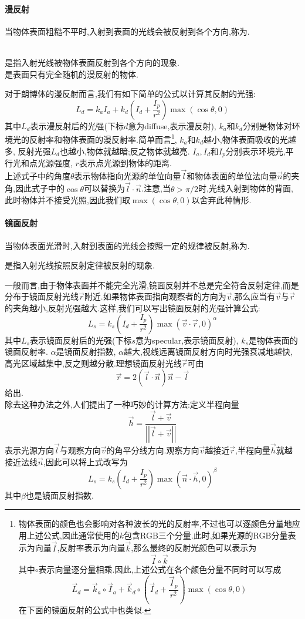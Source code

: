 \documentclass{ctexart}
\begin{document}
\paragraph{漫反射}
当物体表面粗糙不平时,入射到表面的光线会被反射到各个方向,称为.
\begin{definition}[漫反射与朗博体]\\
    是指入射光线被物体表面反射到各个方向的现象.\\
    是表面只有完全随机的漫反射的物体.
\end{definition}
对于朗博体的漫反射而言,我们有如下简单的公式以计算其反射的光强:
\[L_d=k_aI_a+k_d\left(I_d+\dfrac{I_p}{r^2}\right)\max(\cos\theta,0)\]
其中$L_d$表示漫反射后的光强(下标$d$意为diffuse,表示漫反射), $k_a$和$k_d$分别是物体对环境光的反射率和物体表面的漫反射率.简单而言\footnote{物体表面的颜色也会影响对各种波长的光的反射率,不过也可以逐颜色分量地应用上述公式,因此通常使用的$k$包含RGB三个分量.此时,如果光源的RGB分量表示为向量$\vec{I}$,反射率表示为向量$\vec{k}$,那么最终的反射光颜色可以表示为\[\vec{I}\circ\vec{k}\]其中$\circ$表示向量逐分量相乘.因此,上述公式在各个颜色分量不同时可以写成\[\vec{L}_d=\vec{k}_a\circ\vec{I}_a+\vec{k}_d\circ\left(\vec{I}_d+\dfrac{\vec{I}_p}{r^2}\right)\max(\cos\theta,0)\]在下面的镜面反射的公式中也类似.}, $k_a$和$k_d$越小,物体表面吸收的光越多, 反射光强$L_d$也越小,物体就越暗;反之物体就越亮. $I_a,I_d$和$I_p$分别表示环境光,平行光和点光源强度, $r$表示点光源到物体的距离.\\
\indent 上述式子中的角度$\theta$表示物体指向光源的单位向量$\vec{l}$和物体表面的单位法向量$\vec{n}$的夹角,因此式子中的$\cos\theta$可以替换为$\vec{l}\cdot\vec{n}$.注意,当$\theta>\pi/2$时,光线入射到物体的背面,此时物体并不接受光照,因此我们取$\max(\cos\theta,0)$以舍弃此种情形.
\paragraph{镜面反射}
当物体表面光滑时,入射到表面的光线会按照一定的规律被反射,称为.
\begin{definition}[镜面反射]
    是指入射光线按照反射定律被反射的现象.
\end{definition}
一般而言,由于物体表面并不能完全光滑,镜面反射并不总是完全符合反射定律,而是分布于镜面反射光线$\vec{r}$附近.如果物体表面指向观察者的方向为$\vec{v}$,那么应当有$\vec{v}$与$\vec{r}$的夹角越小,反射光强越大.这样,我们可以写出镜面反射的光强计算公式:
\[L_s=k_s\left(I_d+\dfrac{I_p}{r^2}\right)\max(\vec{v}\cdot\vec{r},0)^\alpha\]
其中$L_s$表示镜面反射后的光强(下标$s$意为specular,表示镜面反射), $k_s$是物体表面的镜面反射率. $\alpha$是镜面反射指数, $\alpha$越大,视线远离镜面反射方向时光强衰减地越快,高光区域越集中,反之则越分散.理想镜面反射光线$\vec{r}$可由
\[\vec{r}=2\left(\vec{l}\cdot\vec{n}\right)\vec{n}-\vec{l}\]
给出.\\
\indent 除去这种办法之外,人们提出了一种巧妙的计算方法:定义半程向量
\[\vec{h}=\dfrac{\vec{l}+\vec{v}}{\left|\left|\vec{l}+\vec{v}\right|\right|}\]
表示光源方向$\vec{l}$与观察方向$\vec{v}$的角平分线方向.观察方向$\vec{v}$越接近$\vec{r}$,半程向量$\vec{h}$就越接近法线$\vec{n}$,因此可以将上式改写为
\[L_s=k_s\left(I_d+\dfrac{I_p}{r^2}\right)\max(\vec{n}\cdot\vec{h},0)^\beta\]
其中$\beta$也是镜面反射指数.
\end{document}
